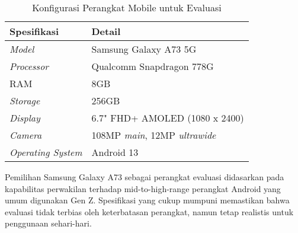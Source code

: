 \begin{table}[h!]
    \centering
    \caption{Konfigurasi Perangkat Mobile untuk Evaluasi}
    \label{tab:mobile-config}
    \begin{tabularx}{\linewidth}{|p{4cm}|X|}
        \hline
        \textbf{Spesifikasi} & \textbf{Detail} \\
        \hline
        \textit{Model} & Samsung Galaxy A73 5G \\
        \hline
        \textit{Processor} & Qualcomm Snapdragon 778G \\
        \hline
        RAM & 8GB \\
        \hline
        \textit{Storage} & 256GB \\
        \hline
        \textit{Display} & 6.7" FHD+ AMOLED (1080 x 2400) \\
        \hline
        \textit{Camera} & 108MP \textit{main}, 12MP \textit{ultrawide} \\
        \hline
        \textit{Operating System} & Android 13 \\
        \hline
    \end{tabularx}
\end{table}

Pemilihan Samsung Galaxy A73 sebagai perangkat evaluasi didasarkan pada kapabilitas perwakilan terhadap mid-to-high-range perangkat Android yang umum digunakan Gen Z. Spesifikasi yang cukup mumpuni memastikan bahwa evaluasi tidak terbias oleh keterbatasan perangkat, namun tetap realistis untuk penggunaan sehari-hari.